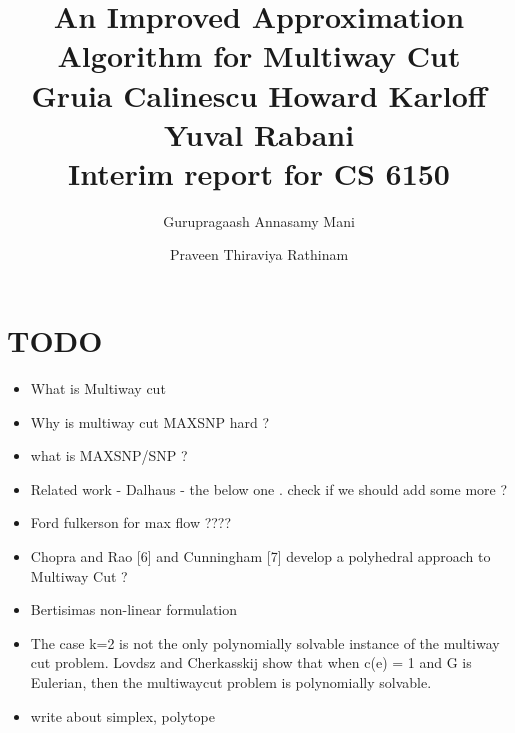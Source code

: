\documentclass[11pt]{article}
\title{An Improved Approximation Algorithm for Multiway Cut\\Gruia Calinescu Howard Karloﬀ Yuval Rabani\\Interim report for CS 6150}
\author{Gurupragaash Annasamy Mani \and Praveen Thiraviya Rathinam}
\begin{document}
\maketitle

\section{TODO}
\begin{itemize}
    \item What is Multiway cut
    \item Why is multiway cut MAXSNP hard ?
    \item what is MAXSNP/SNP ?
    \item Related work - Dalhaus - the below one . check if we should add some more ?
    \item Ford fulkerson for max flow ????
    \item Chopra and Rao [6] and Cunningham [7] develop a polyhedral approach to Multiway Cut ?
    \item Bertisimas non-linear formulation
    \item The case k=2 is not the only polynomially solvable instance of the multiway cut problem. Lovdsz and Cherkasskij show that when c(e) = 1 and  G is Eulerian, then the multiwaycut problem is polynomially solvable. 
    \item write about simplex, polytope
\end{itemize}
\end{document}
